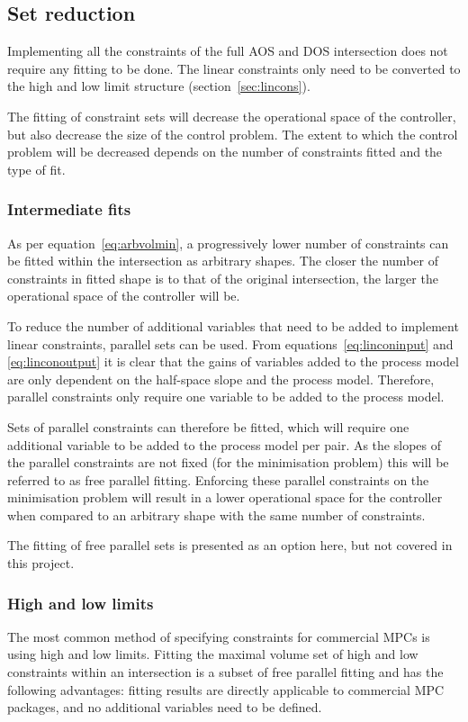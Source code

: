 \subsection{Set reduction}
Implementing all the constraints of the full AOS and DOS intersection does not require any fitting to be done.
The linear constraints only need to be converted to the high and low limit structure (section~\ref{sec:lincons}).

The fitting of constraint sets will decrease the operational space of the controller, but also decrease the size of the control problem.
The extent to which the control problem will be decreased depends on the number of constraints fitted and the type of fit.

\subsubsection{Intermediate fits}
As per equation~\ref{eq:arbvolmin}, a progressively lower number of constraints can be fitted within the intersection as arbitrary shapes.
The closer the number of constraints in fitted shape is to that of the original intersection, the larger the operational space of the controller will be.

To reduce the number of additional variables that need to be added to implement linear constraints, parallel sets can be used.
From equations~\ref{eq:linconinput} and \ref{eq:linconoutput} it is clear that the gains of variables added to the process model are only dependent on the half-space slope and the process model.
Therefore, parallel constraints only require one variable to be added to the process model.

Sets of parallel constraints can therefore be fitted, which will require one additional variable to be added to the process model per pair.
As the slopes of the parallel constraints are not fixed (for the minimisation problem) this will be referred to as free parallel fitting.
Enforcing these parallel constraints on the minimisation problem will result in a lower operational space for the controller when compared to an arbitrary shape with the same number of constraints.

The fitting of free parallel sets is presented as an option here, but not covered in this project.

\subsubsection{High and low limits}
The most common method of specifying constraints for commercial MPCs is using high and low limits.
Fitting the maximal volume set of high and low constraints within an intersection is a subset of free parallel fitting and has the following advantages: fitting results are directly applicable to commercial MPC packages, and no additional variables need to be defined.

